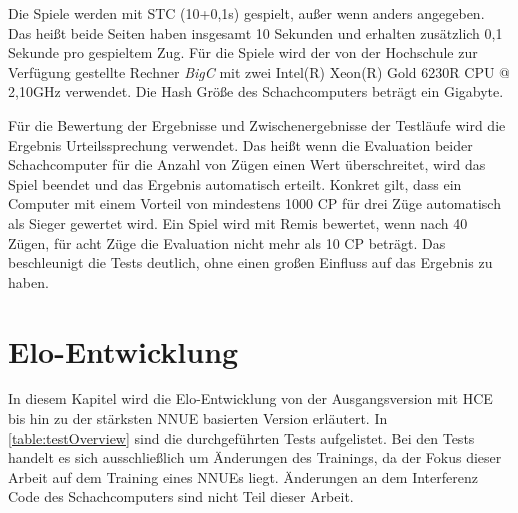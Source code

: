 Die Spiele werden mit \ac{STC} (10+0,1s) gespielt, außer wenn anders angegeben. Das heißt beide Seiten haben insgesamt 10 Sekunden und erhalten zusätzlich 0,1 Sekunde pro gespieltem Zug. Für die Spiele wird der von der Hochschule zur Verfügung gestellte Rechner \emph{BigC} mit zwei Intel(R) Xeon(R) Gold 6230R CPU @ 2,10GHz verwendet. Die Hash Größe des Schachcomputers beträgt ein Gigabyte.

Für die Bewertung der Ergebnisse und Zwischenergebnisse der Testläufe wird die Ergebnis Urteilssprechung verwendet. Das heißt wenn die Evaluation beider Schachcomputer für die Anzahl von Zügen einen Wert überschreitet, wird das Spiel beendet und das Ergebnis automatisch erteilt. Konkret gilt, dass ein Computer mit einem Vorteil von mindestens 1000 \ac{CP} für drei Züge automatisch als Sieger gewertet wird. Ein Spiel wird mit Remis bewertet, wenn nach 40 Zügen, für acht Züge die Evaluation nicht mehr als 10 \ac{CP} beträgt. Das beschleunigt die Tests deutlich, ohne einen großen Einfluss auf das Ergebnis zu haben.

\section{Elo-Entwicklung}

In diesem Kapitel wird die Elo-Entwicklung von der Ausgangsversion mit \ac{HCE} bis hin zu der stärksten \ac{NNUE} basierten Version erläutert. In \autoref{table:testOverview} sind die durchgeführten Tests aufgelistet. Bei den Tests handelt es sich ausschließlich um Änderungen des Trainings, da der Fokus dieser Arbeit auf dem Training eines \acp{NNUE} liegt. Änderungen an dem Interferenz Code des Schachcomputers sind nicht Teil dieser Arbeit.

